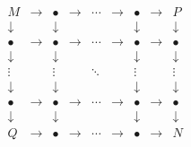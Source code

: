\ensuremath{\displaystyle
\begin{matrix}
M & \to & \bullet & \to & \cdots & \to & \bullet & \to & P \\
\downarrow & & \downarrow & & & & \downarrow & & \downarrow \\
\bullet & \to & \bullet & \to & \cdots & \to & \bullet & \to & \bullet \\
\downarrow & & \downarrow & & & & \downarrow & & \downarrow \\
\vdots & & \vdots & & \ddots & & \vdots & & \vdots \\
\downarrow & & \downarrow & & & & \downarrow & & \downarrow \\
\bullet & \to & \bullet & \to & \cdots & \to & \bullet & \to & \bullet \\
\downarrow & & \downarrow & & & & \downarrow & & \downarrow \\
Q & \to & \bullet & \to & \cdots & \to & \bullet & \to & N
\end{matrix}
}